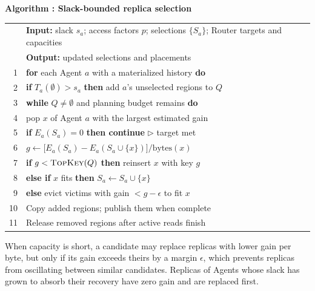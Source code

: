 \par\medskip\noindent\begin{minipage}{\columnwidth}
\raggedright
{}\label{alg:protection}
\textbf{Algorithm \thedesignalgorithm: Slack-bounded replica selection}
\par\smallskip
\begin{tabularx}{\columnwidth}{@{}r@{\quad}X@{}}
\toprule
 & \textbf{Input:} slack $s_a$; access factors $p$; selections
 $\{S_a\}$; Router targets and capacities \\
 & \textbf{Output:} updated selections and placements \\
\midrule
1 & \textbf{for} each Agent $a$ with a materialized history \textbf{do} \\
2 & \quad \textbf{if} $T_a(\emptyset)>s_a$ \textbf{then} add $a$'s unselected
 regions to $Q$ \\
3 & \textbf{while} $Q\neq\emptyset$ and planning budget remains \textbf{do} \\
4 & \quad pop $x$ of Agent $a$ with the largest estimated gain \\
5 & \quad \textbf{if} $E_a(S_a)=0$ \textbf{then continue}
 \hfill$\triangleright$ target met \\
6 & \quad $g\gets\bigl[E_a(S_a)-E_a(S_a\cup\{x\})\bigr]/\mathrm{bytes}(x)$ \\
7 & \quad \textbf{if} $g<\textsc{TopKey}(Q)$ \textbf{then} reinsert $x$ with key $g$ \\
8 & \quad \textbf{else if} $x$ fits \textbf{then} $S_a\gets S_a\cup\{x\}$ \\
9 & \quad \textbf{else} evict victims with gain $<g-\epsilon$ to fit $x$ \\
10 & Copy added regions; publish them when complete \\
11 & Release removed regions after active reads finish \\
\bottomrule
\end{tabularx}
\end{minipage}\par\medskip

When capacity is short, a candidate may replace replicas with lower gain
per byte, but only if its gain exceeds theirs by a margin $\epsilon$,
which prevents replicas from oscillating between similar candidates.
Replicas of Agents whose slack has grown to absorb their recovery have
zero gain and are replaced first.

